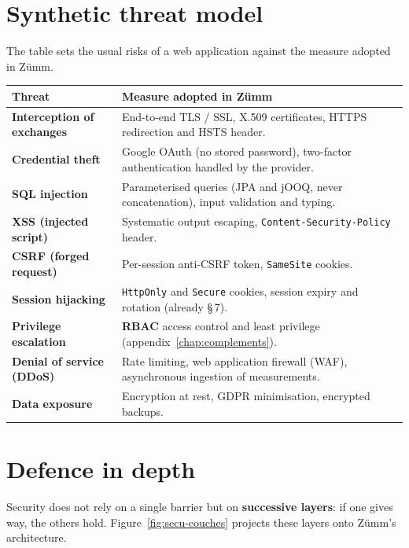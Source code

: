 \section{Synthetic threat model}
The table sets the usual risks of a web application against the measure adopted
in Zümm.
\begin{xltabular}{\textwidth}{>{\bfseries}p{4cm} X}
\toprule
\textbf{Threat} & \textbf{Measure adopted in Zümm} \\
\midrule
\endhead
Interception of exchanges & End-to-end TLS / SSL, X.509 certificates, HTTPS redirection and HSTS header. \\
Credential theft & Google OAuth (no stored password), two-factor authentication handled by the provider. \\
SQL injection & Parameterised queries (JPA and jOOQ, never concatenation), input validation and typing. \\
XSS (injected script) & Systematic output escaping, \texttt{Content-Security-Policy} header. \\
CSRF (forged request) & Per-session anti-CSRF token, \texttt{SameSite} cookies. \\
Session hijacking & \texttt{HttpOnly} and \texttt{Secure} cookies, session expiry and rotation (already §\,7). \\
Privilege escalation & \textbf{RBAC} access control and least privilege (appendix~\ref{chap:complements}). \\
Denial of service (DDoS) & Rate limiting, web application firewall (WAF), asynchronous ingestion of measurements. \\
Data exposure & Encryption at rest, GDPR minimisation, encrypted backups. \\
\bottomrule
\end{xltabular}

\section{Defence in depth}
Security does not rely on a single barrier but on \textbf{successive layers}: if
one gives way, the others hold. Figure~\ref{fig:secu-couches} projects these
layers onto Zümm's architecture.

